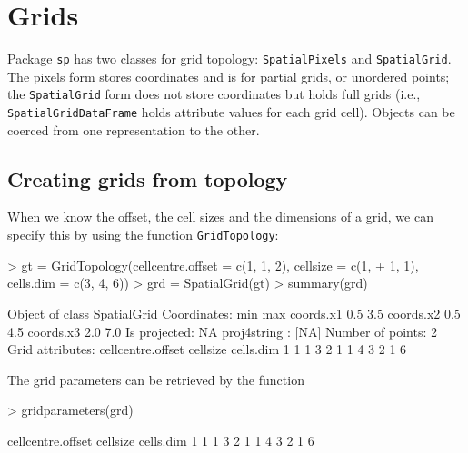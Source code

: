 \documentclass{article}
\begin{document}
\section{Grids}
Package {\tt sp} has two classes for grid topology: {\tt SpatialPixels}
and {\tt SpatialGrid}. The pixels form stores coordinates and is for
partial grids, or unordered points; the {\tt SpatialGrid} form does not
store coordinates but holds full grids (i.e., {\tt SpatialGridDataFrame}
holds attribute values for each grid cell). Objects can be coerced from
one representation to the other.

\subsection{Creating grids from topology}
When we know the offset, the cell sizes and the dimensions of a grid, we
can specify this by using the function {\tt GridTopology}:
\begin{Schunk}
\begin{Sinput}
> gt = GridTopology(cellcentre.offset = c(1, 1, 2), cellsize = c(1, 
+     1, 1), cells.dim = c(3, 4, 6))
> grd = SpatialGrid(gt)
> summary(grd)
\end{Sinput}
\begin{Soutput}
Object of class SpatialGrid
Coordinates:
          min max
coords.x1 0.5 3.5
coords.x2 0.5 4.5
coords.x3 2.0 7.0
Is projected: NA 
proj4string : [NA]
Number of points: 2
Grid attributes:
  cellcentre.offset cellsize cells.dim
1                 1        1         3
2                 1        1         4
3                 2        1         6
\end{Soutput}
\end{Schunk}

The grid parameters can be retrieved by the function
\begin{Schunk}
\begin{Sinput}
> gridparameters(grd)
\end{Sinput}
\begin{Soutput}
  cellcentre.offset cellsize cells.dim
1                 1        1         3
2                 1        1         4
3                 2        1         6
\end{Soutput}
\end{Schunk}
\end{document}
